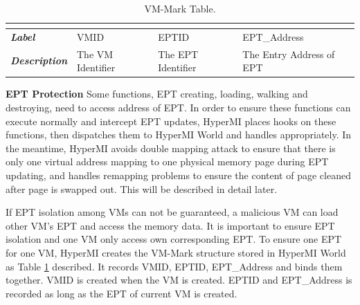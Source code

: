 \documentclass[conference]{IEEEtran}
\begin{document}
\begin{table}[htbp]
\centering
\caption{VM-Mark Table.}\label{tab1}
\begin{tabular}{p{1.4cm}|p{1.2cm}|p{1.1cm}|p{1.7cm}}
\hline
\multicolumn{4}{c}{\bfseries\textbf\centering{VM-Mark Table}}\\
\hline
{\itshape\bfseries Label} & VMID & EPTID & EPT\_Address\\
\hline
{\itshape\bfseries Description} & { The VM Identifier} & The EPT Identifier & The Entry Address of EPT\\
\hline
\end{tabular}
\end{table}


\textbf{EPT Protection}
Some functions, EPT creating, loading, walking and destroying, need to access address of EPT.
 In order to ensure these functions can execute normally and intercept EPT updates, HyperMI places hooks on these functions, then dispatches them to HyperMI World and handles appropriately. In the meantime, HyperMI avoids double mapping attack to ensure that there is only one virtual address mapping to one physical memory page during EPT updating, and handles remapping problems to ensure the content of page cleaned after page is swapped out. This will be described in detail later.

If EPT isolation among VMs can not be guaranteed, a malicious VM can load other VM's EPT and access the memory data. It is important to ensure EPT isolation and one VM only access own corresponding EPT.
To ensure one EPT for one VM, HyperMI creates the VM-Mark structure stored in HyperMI World as Table \ref{tab1} described. It records VMID, EPTID, EPT\_Address and binds them together. VMID is created when the VM is created. 
 EPTID and EPT\_Address is recorded as long as the EPT of current VM is created.
\end{document}
